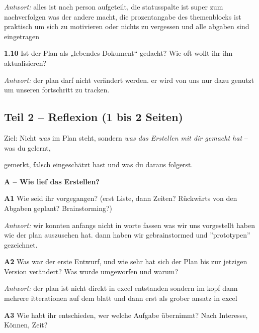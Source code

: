 {\par\noindent\emph{Antwort:} alles ist nach person aufgeteilt, die statusspalte ist super zum nachverfolgen was der andere macht, die prozentangabe des themenblocks ist praktisch um sich zu motivieren oder nichts zu vergessen und alle abgaben sind eingetragen\par\smallskip
\par\noindent \textbf{1.10} Ist der Plan als „lebendes Dokument“ gedacht? Wie oft wollt ihr ihn aktualisieren?\par
\par\noindent\emph{Antwort:} der plan darf nicht verändert werden. er wird von uns nur dazu genutzt um unseren fortschritt zu tracken.\par\smallskip
\subsection*{Teil 2 – Reflexion (1 bis 2 Seiten)}
\par\noindent Ziel: Nicht \emph{was} im Plan steht, sondern \emph{was das Erstellen mit dir gemacht hat} – was du gelernt,\par
\par\noindent gemerkt, falsch eingeschätzt hast und was du daraus folgerst.\par
\par\medskip\noindent\textbf{A – Wie lief das Erstellen?}\par
\par\noindent \textbf{A1} Wie seid ihr vorgegangen? (erst Liste, dann Zeiten? Rückwärts von den Abgaben geplant? Brainstorming?)\par
\par\noindent\emph{Antwort:} wir konnten anfangs nicht in worte fassen was wir uns vorgestellt haben wie der plan auszusehen hat. dann haben wir gebrainstormed und ''prototypen'' gezeichnet.\par\smallskip
\par\noindent \textbf{A2} Was war der erste Entwurf, und wie sehr hat sich der Plan bis zur jetzigen Version verändert? Was wurde umgeworfen und warum?\par
\par\noindent\emph{Antwort:} der plan ist nicht direkt in excel entstanden sondern im kopf dann mehrere itterationen auf dem blatt und dann erst als grober ansatz in excel\par\smallskip
\par\noindent \textbf{A3} Wie habt ihr entschieden, wer welche Aufgabe übernimmt? Nach Interesse, Können, Zeit?\par
}
